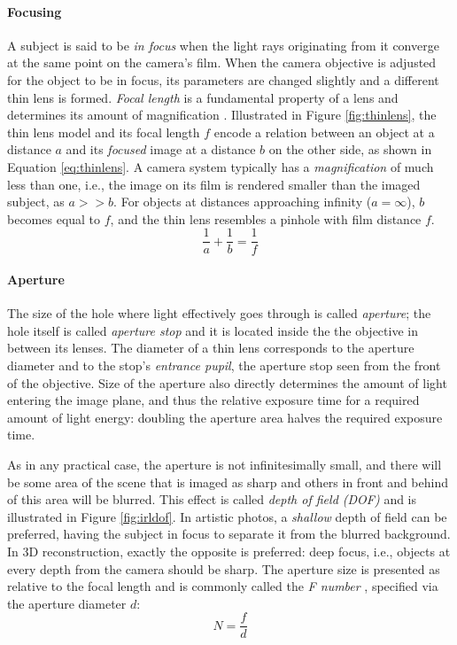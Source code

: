 \paragraph{Focusing}
A subject is said to be \emph{in focus} when the light rays originating from it converge at the same point on the camera's film.
When the camera objective is adjusted for the object to be in focus, its parameters are changed slightly and a different thin lens is formed.
\emph{Focal length} is a fundamental property of a lens and determines its amount of magnification \cite{szeliski10vision,greenleaf1950photographic}.
Illustrated in Figure \ref{fig:thinlens}, the thin lens model and its focal length $f$ encode a relation between an object at a distance $a$ and its \emph{focused} image at a distance $b$ on the other side, as shown in Equation \ref{eq:thinlens}.
A camera system typically has a \emph{magnification} of much less than one, i.e., the image on its film is rendered smaller than the imaged subject, as $a >> b$.
For objects at distances approaching infinity ($a = \infty$), $b$ becomes equal to $f$, and the thin lens resembles a pinhole with film distance $f$.
\begin{equation} \label{eq:thinlens}
	\frac{1}{a} + \frac{1}{b} = \frac{1}{f}
\end{equation}


\paragraph{Aperture}
The size of the hole where light effectively goes through is called \emph{aperture}; the hole itself is called \emph{aperture stop} and it is located inside the the objective in between its lenses.
The diameter of a thin lens corresponds to the aperture diameter and to the stop's \emph{entrance pupil}, the aperture stop seen from the front of the objective.
Size of the aperture also directly determines the amount of light entering the image plane, and thus the relative exposure time for a required amount of light energy: doubling the aperture area halves the required exposure time.
\cite{greenleaf1950photographic}

As in any practical case, the aperture is not infinitesimally small, and there will be some area of the scene that is imaged as sharp and others in front and behind of this area will be blurred.
This effect is called \emph{depth of field (DOF)} and is illustrated in Figure \ref{fig:irldof}.
In artistic photos, a \emph{shallow} depth of field can be preferred, having the subject in focus to separate it from the blurred background.
In 3D reconstruction, exactly the opposite is preferred: deep focus, i.e., objects at every depth from the camera should be sharp.
The aperture size is presented as relative to the focal length and is commonly called the \emph{F number} \cite{szeliski10vision,greenleaf1950photographic}, specified via the aperture diameter $d$:
\begin{equation} \label{eq:fnumber}
	N = \frac{f}{d}
\end{equation}

